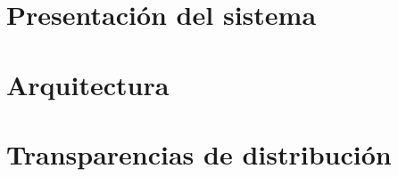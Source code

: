 
\section{Presentación del sistema}

\section{Arquitectura}

\section{Transparencias de distribución}

